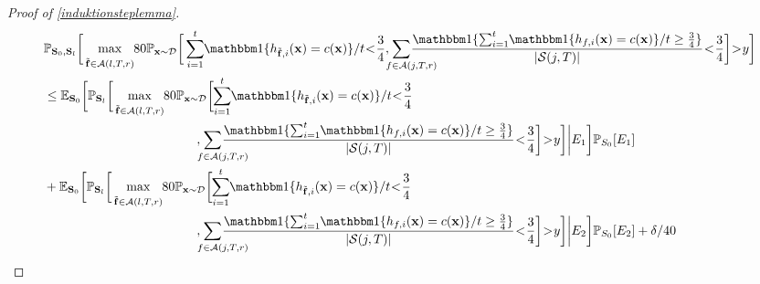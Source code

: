 \begin{proof}[Proof of \cref{induktionsteplemma}]
\begin{align}\label{highprobabilityeq5}
  &\p_{\rS_{0},\rS_{l}}\bigg[  \max_{\stackrel{}{\rf\in\cA(l,T,r)}} \negmedspace 80\p_{\rx\sim \cD}
  \bigg[ \sum_{i=1}^{t}\negmedspace  \ind\{h_{\rf,i}(\rx)=c(\rx)\}/t\negmedspace <\negmedspace \frac{3}{4},
  \negmedspace \negmedspace  \negmedspace  \negmedspace \negmedspace  \negmedspace \negmedspace \negmedspace \negmedspace\sum_{\text{\quad\quad}f\in \cA(j,T,r)} \negmedspace \negmedspace \negmedspace \negmedspace\negmedspace \negmedspace  \negmedspace \negmedspace \negmedspace \negmedspace \frac{\ind\{\sum_{i=1}^{t}\negmedspace  \ind\{h_{f,i}(\rx)=c(\rx)\}/t\geq \frac{3}{4}\}}{|\cS(j,T)|}
  \negmedspace<\negmedspace\frac{3}{4}\bigg]\negmedspace> \negmedspace y\bigg]\nonumber
\\
&\leq
\e_{\rS_{0}}\bigg[ \p_{\rS_{l}}\bigg[    \max_{\stackrel{}{\rf\in\cA(l,T,r)}} \negmedspace    80\p_{\rx\sim \cD}
\bigg[
  \negmedspace \sum_{i=1}^{t}\negmedspace  \ind\{h_{\rf,i}(\rx)=c(\rx)\}/t\negmedspace <\negmedspace \frac{3}{4}\\&\quad\quad\quad\quad\quad\quad\quad\quad\quad\quad\quad\quad,
\negmedspace \negmedspace  \negmedspace  \negmedspace \negmedspace  \negmedspace \negmedspace \negmedspace \negmedspace\sum_{\text{\quad\quad}f\in \cA(j,T,r)} \negmedspace \negmedspace \negmedspace \negmedspace\negmedspace \negmedspace  \negmedspace \negmedspace \negmedspace \negmedspace \frac{\ind\{\sum_{i=1}^{t}\negmedspace  \ind\{h_{f,i}(\rx)=c(\rx)\}/t\geq \frac{3}{4}\}}{|\cS(j,T)|}
\negmedspace<\negmedspace\frac{3}{4}\bigg]\negmedspace>\negmedspace y\bigg] \bigg |  E_1 \bigg]\p_{S_{0}}[E_1]\nonumber
\\
&+
\e_{\rS_{0}}\bigg[ \p_{\rS_{l}}\bigg[    \max_{\stackrel{}{\rf\in\cA(l,T,r)}}\negmedspace    80\p_{\rx\sim \cD}
\bigg[
  \negmedspace \sum_{i=1}^{t}\negmedspace  \ind\{h_{\rf,i}(\rx)=c(\rx)\}/t\negmedspace <\negmedspace \frac{3}{4}\nonumber
  \\
  &\quad \quad\quad\quad\quad\quad\quad\quad\quad\quad\quad\quad,
\negmedspace \negmedspace  \negmedspace  \negmedspace \negmedspace  \negmedspace \negmedspace \negmedspace \negmedspace\sum_{\text{\quad\quad}f\in \cA(j,T,r)} \negmedspace \negmedspace \negmedspace \negmedspace\negmedspace \negmedspace  \negmedspace \negmedspace \negmedspace \negmedspace \frac{\ind\{\sum_{i=1}^{t}\negmedspace  \ind\{h_{f,i}(\rx)=c(\rx)\}/t\geq \frac{3}{4}\}}{|\cS(j,T)|}
\negmedspace<\negmedspace\frac{3}{4}\bigg]\negmedspace>\negmedspace y\bigg] \bigg |  E_2 \bigg]\p_{S_{0}}[E_2]+
\delta/\cnn\nonumber
\end{align}  


\end{proof}

